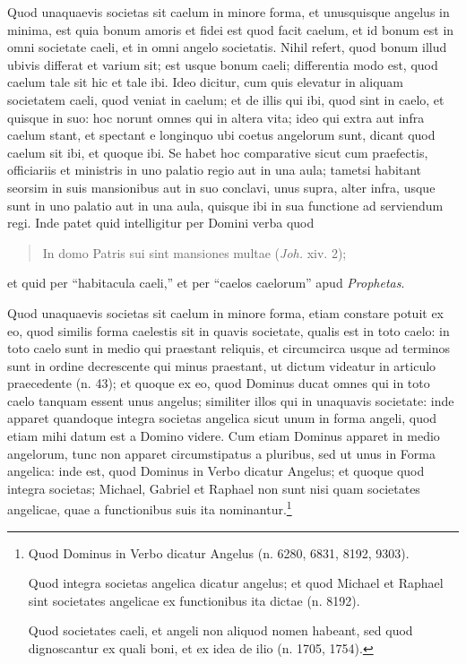 
\begin{topic}{51}
    Quod unaquaevis societas sit caelum in minore forma, et unusquisque angelus in minima, est quia bonum amoris et
    fidei est quod facit caelum, et id bonum est in omni societate caeli, et in omni angelo societatis.
    Nihil refert, quod bonum illud ubivis differat et varium sit; est usque bonum caeli; differentia modo est, quod
    caelum tale sit hic et tale ibi.
    Ideo dicitur, cum quis elevatur in aliquam societatem caeli, quod veniat in caelum; et de illis qui ibi, quod sint
    in caelo, et quisque in suo: hoc norunt omnes qui in altera vita; ideo qui extra aut infra caelum stant, et spectant
    e longinquo ubi coetus angelorum sunt, dicant quod caelum sit ibi, et quoque ibi.
    Se habet hoc comparative sicut cum praefectis, officiariis et ministris in uno palatio regio aut in una aula;
    tametsi habitant seorsim in suis mansionibus aut in suo conclavi, unus supra, alter infra, usque sunt in uno palatio
    aut in una aula, quisque ibi in sua functione ad serviendum regi.
    Inde patet quid intelligitur per Domini verba quod
    \begin{quote}
        In domo Patris sui sint mansiones multae (\emph{Joh.} xiv. 2);
    \end{quote}
    et quid per ``habitacula caeli,'' et per ``caelos caelorum'' apud \emph{Prophetas}.
\end{topic}

\begin{topic}{52}
    Quod unaquaevis societas sit caelum in minore forma, etiam constare potuit ex eo, quod similis forma caelestis sit
    in quavis societate, qualis est in toto caelo: in toto caelo sunt in medio qui praestant reliquis, et circumcirca
    usque ad terminos sunt in ordine decrescente qui minus praestant, ut dictum videatur in articulo praecedente (n.
    43); et quoque ex eo, quod Dominus ducat omnes qui in toto caelo tanquam essent unus angelus; similiter illos qui in
    unaquavis societate: inde apparet quandoque integra societas angelica sicut unum in forma angeli, quod etiam mihi
    datum est a Domino videre.
    Cum etiam Dominus apparet in medio angelorum, tunc non apparet circumstipatus a pluribus, sed ut unus in Forma
    angelica: inde est, quod Dominus in Verbo dicatur Angelus; et quoque quod integra societas; Michael, Gabriel et
    Raphael non sunt nisi quam societates angelicae, quae a functionibus suis ita nominantur.\footnote{Quod Dominus in
    Verbo dicatur Angelus (n. 6280, 6831, 8192, 9303).

    Quod integra societas angelica dicatur angelus; et quod Michael et Raphael sint societates angelicae ex functionibus
    ita dictae (n. 8192).

    Quod societates caeli, et angeli non aliquod nomen habeant, sed quod dignoscantur ex quali boni, et ex idea de ilio
    (n. 1705, 1754).}
\end{topic}

